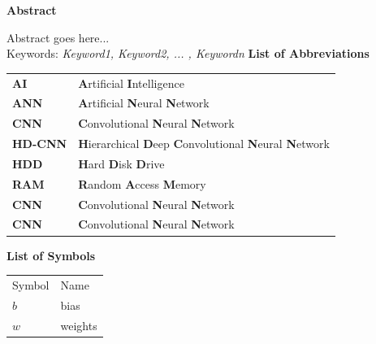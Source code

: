 \documentclass[12pt]{extarticle}
\begin{document}
	\tableofcontents
	\listoffigures
	\listoftables
	\newpage
	\begin{center}
		\LARGE{\textbf{Abstract}}\\ \vspace{1cm}
	\end{center}
	Abstract goes here...\\
	Keywords: \emph{Keyword1, Keyword2, ... , Keywordn}
	\newpage
	\LARGE{\textbf{List of Abbreviations}}\\ \vspace{1cm}
	\begin{center}
		\begin{tabular}{l l}
			\multicolumn{1}{p{3cm}}{\large{\textbf{AI}}} &  \multicolumn{1}{p{8cm}}{\large{\textbf{A}rtificial \textbf{I}ntelligence}} \\
			\multicolumn{1}{p{3cm}}{\large{\textbf{ANN}}} &  \multicolumn{1}{p{8cm}}{\large{\textbf{A}rtificial \textbf{N}eural \textbf{N}etwork}} \\
			\multicolumn{1}{p{3cm}}{\large{\textbf{CNN}}} &  \multicolumn{1}{p{8cm}}{\large{\textbf{C}onvolutional \textbf{N}eural \textbf{N}etwork}}\\ 
			\multicolumn{1}{p{3cm}}{\large{\textbf{HD-CNN}}} &  \multicolumn{1}{p{8cm}}{\large{\textbf{H}ierarchical \textbf{D}eep \textbf{C}onvolutional \textbf{N}eural \textbf{N}etwork}}\\ 
			\multicolumn{1}{p{3cm}}{\large{\textbf{HDD}}} &  \multicolumn{1}{p{8cm}}{\large{\textbf{H}ard \textbf{D}isk \textbf{D}rive}}\\ 
			\multicolumn{1}{p{3cm}}{\large{\textbf{RAM}}} &  \multicolumn{1}{p{8cm}}{\large{\textbf{R}andom \textbf{A}ccess \textbf{M}emory}}\\ 
			\multicolumn{1}{p{3cm}}{\large{\textbf{CNN}}} &  \multicolumn{1}{p{8cm}}{\large{\textbf{C}onvolutional \textbf{N}eural \textbf{N}etwork}}\\ 
			\multicolumn{1}{p{3cm}}{\large{\textbf{CNN}}} &  \multicolumn{1}{p{8cm}}{\large{\textbf{C}onvolutional \textbf{N}eural \textbf{N}etwork}}
			 
		\end{tabular}
	\end{center}

	\newpage
	\LARGE{\textbf{List of Symbols}}\\ \vspace{1cm}
	\large{}
	\begin{center}
		\begin{tabular}{l l}
			{Symbol} & {Name} \\
			$b$ & bias\\
			$w$ & weights
		\end{tabular}
	\end{center}
	
\end{document}
